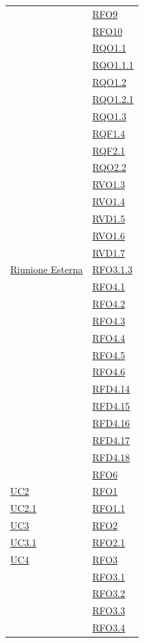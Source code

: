 \begin{longtable}{|>{\centering}m{5cm}|m{5cm}<{\centering}|}
& \hyperlink{RFO9}{RFO9}\\
& \hyperlink{RFO10}{RFO10}\\
& \hyperlink{RQO1.1}{RQO1.1}\\
& \hyperlink{RQO1.1.1}{RQO1.1.1}\\
& \hyperlink{RQO1.2}{RQO1.2}\\
& \hyperlink{RQO1.2.1}{RQO1.2.1}\\
& \hyperlink{RQO1.3}{RQO1.3}\\
& \hyperlink{RQF1.4}{RQF1.4}\\
& \hyperlink{RQF2.1}{RQF2.1}\\
& \hyperlink{RQO2.2}{RQO2.2}\\
& \hyperlink{RVO1.3}{RVO1.3}\\
& \hyperlink{RVO1.4}{RVO1.4}\\
& \hyperlink{RVD1.5}{RVD1.5}\\
& \hyperlink{RVO1.6}{RVO1.6}\\
& \hyperlink{RVD1.7}{RVD1.7}\\ \hline
\hyperlink{Riunione Esterna}{Riunione Esterna} & \hyperlink{RFO3.1.3}{RFO3.1.3}\\
& \hyperlink{RFO4.1}{RFO4.1}\\
& \hyperlink{RFO4.2}{RFO4.2}\\
& \hyperlink{RFO4.3}{RFO4.3}\\
& \hyperlink{RFO4.4}{RFO4.4}\\
& \hyperlink{RFO4.5}{RFO4.5}\\
& \hyperlink{RFO4.6}{RFO4.6}\\

& \hyperlink{RFD4.14}{RFD4.14}\\
& \hyperlink{RFD4.15}{RFD4.15}\\
& \hyperlink{RFD4.16}{RFD4.16}\\
& \hyperlink{RFD4.17}{RFD4.17}\\
& \hyperlink{RFD4.18}{RFD4.18}\\
& \hyperlink{RFO6}{RFO6}\\ \hline
\hyperref[UC2]{UC2} & \hyperlink{RFO1}{RFO1}\\ \hline
\hyperref[UC2.1]{UC2.1} & \hyperlink{RFO1.1}{RFO1.1}\\ \hline
\hyperref[UC3]{UC3} & \hyperlink{RFO2}{RFO2}\\ \hline
\hyperref[UC3.1]{UC3.1} & \hyperlink{RFO2.1}{RFO2.1}\\ \hline
\hyperref[UC4]{UC4} & \hyperlink{RFO3}{RFO3}\\
& \hyperlink{RFO3.1}{RFO3.1}\\
& \hyperlink{RFO3.2}{RFO3.2}\\
& \hyperlink{RFO3.3}{RFO3.3}\\
& \hyperlink{RFO3.4}{RFO3.4}\\


\end{longtable}

